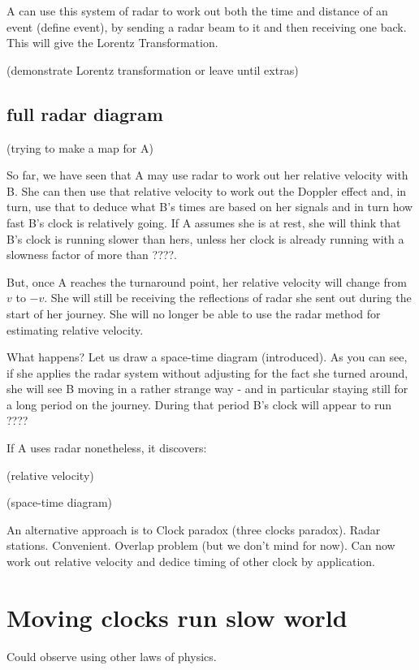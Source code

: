 \documentclass[a4paper]{report}
\begin{document}
A can use this system of radar to work out both the time and distance of an event (define event), by sending a radar beam to it and then receiving one back. This will give the Lorentz Transformation.

(demonstrate Lorentz transformation or leave until extras)
\subsection*{full radar diagram}
(trying to make a map for A)

So far, we have seen that A may use radar to work out her relative velocity with B. She can then use that relative velocity to work out the Doppler effect and, in turn, use that to deduce what B's times are based on her signals and in turn how fast B's clock is relatively going. If A assumes she is at rest, she will think that B's clock is running slower than hers, unless her clock is already running with a slowness factor of more than ????.

But, once A reaches the turnaround point, her relative velocity will change from $v$ to $-v$. She will still be receiving the reflections of radar she sent out during the start of her journey. She will no longer be able to use the radar method for estimating relative velocity.

What happens? Let us draw a space-time diagram (introduced). As you can see, if she applies the radar system without adjusting for the fact she turned around, she will see B moving in a rather strange way - and in particular staying still for a long period on the journey. During that period B's clock will appear to run ???? 

If A uses radar nonetheless, it discovers:

(relative velocity)

(space-time diagram)



An alternative approach is to  Clock paradox (three clocks paradox). Radar stations. Convenient. Overlap problem (but we don't mind for now). Can now work out relative velocity and dedice timing of other clock by application.



\section*{Moving clocks run slow world}
Could observe using other laws of physics.
\end{document}

